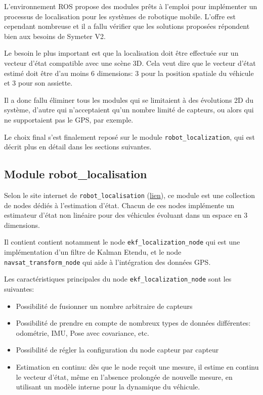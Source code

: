 \documentclass[12pt,a4paper]{report}
\begin{document}
	\para L'environnement ROS propose des modules prêts à l'emploi pour implémenter un processus de localisation pour les systèmes de robotique mobile. L'offre est cependant nombreuse et il a fallu vérifier que les solutions proposées répondent bien aux besoins de Symeter V2.
	
	\para Le besoin le plus important est que la localisation doit être effectuée sur un vecteur d'état compatible avec une scène 3D. Cela veut dire que le vecteur d'état estimé doit être d'au moins 6 dimensions: 3 pour la position spatiale du véhicule et 3 pour son assiette.
	
	\para Il a donc fallu éliminer tous les modules qui se limitaient à des évolutions 2D du système, d'autre qui n'acceptaient qu'un nombre limité de capteurs, ou alors qui ne supportaient pas le GPS, par exemple.
	
	\para Le choix final s'est finalement reposé sur le module \verb|robot_localization|, qui est décrit plus en détail dans les sections suivantes.
	
	\subsection{Module robot\_localisation}
	Selon le site internet de \verb|robot_localisation| (\href{http://docs.ros.org/melodic/api/robot_localization/html/index.html}{lien}), ce module est une collection de nodes dédiés à l'estimation d'état. Chacun de ces nodes implémente un estimateur d'état non linéaire pour des véhicules évoluant dans un espace en 3 dimensions.
	
	\para Il contient contient notamment le node \verb|ekf_localization_node| qui est une implémentation d'un filtre de Kalman Etendu, et le node \verb|navsat_transform_node| qui aide à l'intégration des données GPS.
	
	\para Les caractéristiques principales du node \verb|ekf_localization_node| sont les suivantes:
	\begin{itemize}
		\item Possibilité de fusionner un nombre arbitraire de capteurs
		\item Possibilité de prendre en compte de nombreux types de données différentes: odométrie, IMU, Pose avec covariance, etc.
		\item Possibilité de régler la configuration du node capteur par capteur
		\item Estimation en continu: dès que le node reçoit une mesure, il estime en continu le vecteur d'état, même en l'absence prolongée de nouvelle mesure, en utilisant un modèle interne pour la dynamique du véhicule.
	\end{itemize}
\end{document}
